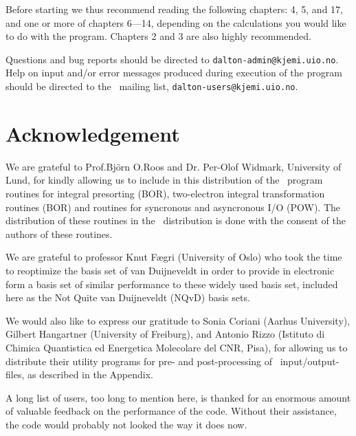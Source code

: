 Before starting we thus recommend reading
the following chapters: 4, 5, and 17, and one or more of chapters
6---14, depending on the 
calculations you would like to do with the program. Chapters
2 and 3 are also highly recommended.


Questions and bug reports should be directed to
\verb|dalton-admin@kjemi.uio.no|. Help on input and/or error messages
produced during execution of the program should be directed to the
\siraba\ mailing list, \verb|dalton-users@kjemi.uio.no|.


\section{Acknowledgement}

We are grateful to Prof.Bj\"{o}rn O.Roos and Dr. Per-Olof Widmark,
University of Lund, for kindly allowing us to include in this
distribution of the \siraba\ program routines for integral
presorting
(BOR), two-electron integral transformation routines (BOR) and 
routines for syncronous and asyncronous I/O (POW). The distribution of
these routines in the \siraba\ distribution is done with the consent
of the authors of these routines.

We are grateful to professor Knut F\ae gri (University of Oslo) who
took the time to reoptimize the basis set of van Duijneveldt in order
to provide in electronic form a basis set of similar performance to
these widely used basis set, included here as the Not Quite van
Duijneveldt (NQvD) basis sets.

We would also like to express our gratitude to Sonia Coriani (Aarhus
University), Gilbert Hangartner (University of Freiburg), and Antonio
Rizzo (Istituto di Chimica Quantistica ed Energetica Molecolare del
CNR, Pisa), for allowing us to distribute their utility programs for
pre- and post-processing of \siraba\ input/output-files, as described
in the Appendix.

A long list of users, too long to mention here, is thanked for an
enormous amount of valuable feedback on the performance of the
code. Without their assistance, the code would probably not looked the
way it does now.